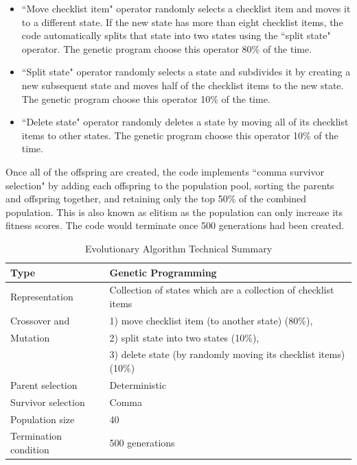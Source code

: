 \documentclass[preprint,12pt,3p]{elsarticle}
\begin{document}
\begin{itemize}
\item ``Move checklist item" operator randomly selects a checklist item and moves it to a different state. If the new state has more than eight checklist items, the code automatically splits that state into two states using the ``split state" operator. The genetic program choose this operator 80\% of the time.
\item ``Split state" operator randomly selects a state and subdivides it by creating a new subsequent state and moves half of the checklist items to the new state. The genetic program choose this operator 10\% of the time.
\item ``Delete state" operator randomly deletes a state by moving all of its checklist items to other states. The genetic program choose this operator 10\% of the time.
\end{itemize}

Once all of the offspring are created, the code implements ``comma survivor selection" by adding each offspring to the population pool, sorting the parents and offspring together, and retaining only the top 50\% of the combined population. This is also known as elitism as the population can only increase its fitness scores. The code would terminate once 500 generations had been created.

\begin{table}[h]
\caption{Evolutionary Algorithm Technical Summary}
\label{TechnicalSummary}
\centering
\begin{tabular}{|p{1.70in}|p{4.30in}|}
\hline
{Type}  & {Genetic Programming} \\ \hline
{Representation} & {Collection of states which are a collection of checklist items}  \\ \hline
{Crossover and} & {1) move checklist item (to another state) (80\%), } \\
{Mutation} & {2) split state into two states (10\%), } \\ 
{} & {3) delete state (by randomly moving its checklist items) (10\%) } \\ \hline
{Parent selection} & {Deterministic} \\ \hline
{Survivor selection}  & {Comma} \\ \hline
{Population size}  & {40} \\ \hline
{Termination \mbox{condition}} & {500 generations} \\ \hline
\end{tabular}
\end{table}
\end{document}
